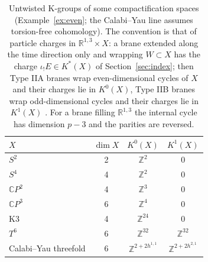 \documentclass[reqno,11pt]{amsart}
\theoremstyle{definition}
\newcommand{\ZZ}{\mathbb{Z}}
\newcommand{\RR}{\mathbb{R}}
\newcommand{\CC}{\mathbb{C}}
\begin{document}
\begin{table}[ht]
\centering
\caption{Untwisted K-groups of some compactification spaces (Example~\ref{ex:even}; the Calabi--Yau line assumes torsion-free cohomology). The convention is that of particle charges in $\RR^{1,3}\times X$: a brane extended along the time direction only and wrapping $W\subset X$ has the charge $\iota_!E\in K^*(X)$ of Section~\ref{sec:index}; then Type IIA branes wrap even-dimensional cycles of $X$ and their charges lie in $K^0(X)$, Type IIB branes wrap odd-dimensional cycles and their charges lie in $K^1(X)$ \cite{Wit98}. For a brane filling $\RR^{1,3}$ the internal cycle has dimension $p-3$ and the parities are reversed.}
\label{tab:kgroups}
\begin{tabular}{lccc}
\toprule
$X$ & $\dim X$ & $K^0(X)$ & $K^1(X)$\\
\midrule
$S^2$ & 2 & $\ZZ^2$ & $0$\\
$S^4$ & 4 & $\ZZ^2$ & $0$\\
$\CC P^2$ & 4 & $\ZZ^3$ & $0$\\
$\CC P^3$ & 6 & $\ZZ^4$ & $0$\\
K3 & 4 & $\ZZ^{24}$ & $0$\\
$T^6$ & 6 & $\ZZ^{32}$ & $\ZZ^{32}$\\
Calabi--Yau threefold & 6 & $\ZZ^{2+2h^{1,1}}$ & $\ZZ^{2+2h^{2,1}}$\\
\bottomrule
\end{tabular}
\end{table}
\end{document}
